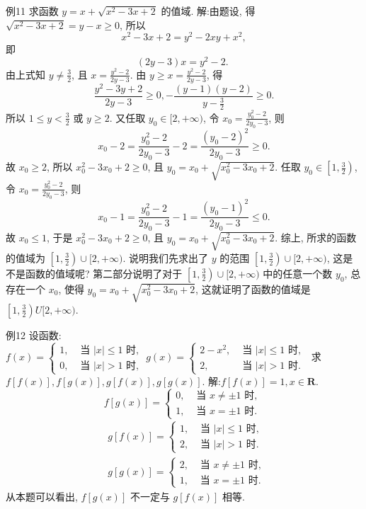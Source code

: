 例11 求函数 $y=x+\sqrt{x^2-3 x+2}$ 的值域.
解:由题设, 得 $\sqrt{x^2-3 x+2}=y-x \geqslant 0$, 所以
$$
x^2-3 x+2=y^2-2 x y+x^2,
$$
即
$$
(2 y-3) x=y^2-2 \text {. }
$$
由上式知 $y \neq \frac{3}{2}$, 且 $x=\frac{y^2-2}{2 y-3}$. 由 $y \geqslant x=\frac{y^2-2}{2 y-3}$, 得
$$
\frac{y^2-3 y+2}{2 y-3} \geqslant 0,-\frac{(y-1)(y-2)}{y-\frac{3}{2}} \geqslant 0 .
$$
所以 $1 \leqslant y<\frac{3}{2}$ 或 $y \geqslant 2$.
又任取 $y_0 \in[2,+\infty)$, 令 $x_0=\frac{y_0^2-2}{2 y_0-3}$, 则
$$
x_0-2=\frac{y_0^2-2}{2 y_0-3}-2=\frac{\left(y_0-2\right)^2}{2 y_0-3} \geqslant 0 .
$$
故 $x_0 \geqslant 2$, 所以 $x_0^2-3 x_0+2 \geqslant 0$, 且 $y_0=x_0+\sqrt{x_0^2-3 x_0+2}$.
任取 $y_0 \in\left[1, \frac{3}{2}\right)$, 令 $x_0=\frac{y_0^2-2}{2 y_0-3}$, 则
$$
x_0-1=\frac{y_0^2-2}{2 y_0-3}-1=\frac{\left(y_0-1\right)^2}{2 y_0-3} \leqslant 0 .
$$
故 $x_0 \leqslant 1$, 于是 $x_0^2-3 x_0+2 \geqslant 0$, 且 $y_0=x_0+\sqrt{x_0^2-3 x_0+2}$.
综上, 所求的函数的值域为 $\left[1, \frac{3}{2}\right) \cup[2,+\infty)$.
说明我们先求出了 $y$ 的范围 $\left[1, \frac{3}{2}\right) \cup[2,+\infty)$, 这是不是函数的值域呢? 第二部分说明了对于 $\left[1, \frac{3}{2}\right) \cup[2,+\infty)$ 中的任意一个数 $y_0$, 总存在一个 $x_0$, 使得 $y_0=x_0+\sqrt{x_0^2-3 x_0+2}$, 这就证明了函数的值域是 $\left[1, \frac{3}{2}\right) U [2,+\infty)$.



例12 设函数:
$f(x)=\left\{\begin{array}{ll}1, & \text { 当 }|x| \leqslant 1 \text { 时, } \\ 0, & \text { 当 }|x|>1 \text { 时, }\end{array} g(x)= \begin{cases}2-x^2, & \text { 当 }|x| \leqslant 1 \text { 时, } \\ 2, & \text { 当 }|x|>1 \text { 时.
}\end{cases}\right.$
求 $f[f(x)], f[g(x)], g[f(x)], g[g(x)]$.
解:$f[f(x)]=1, x \in \mathbf{R}$.
$$
f[g(x)]= \begin{cases}0, & \text { 当 } x \neq \pm 1 \text { 时, } \\ 1, & \text { 当 } x= \pm 1 \text { 时.
}\end{cases}
$$
$$
\begin{aligned}
& g[f(x)]= \begin{cases}1, & \text { 当 }|x| \leqslant 1 \text { 时, } \\
2, & \text { 当 }|x|>1 \text { 时.
}\end{cases} \\
& g[g(x)]= \begin{cases}2, & \text { 当 } x \neq \pm 1 \text { 时, } \\
1, & \text { 当 } x= \pm 1 \text { 时.
}\end{cases}
\end{aligned}
$$
从本题可以看出, $f[g(x)]$ 不一定与 $g[f(x)]$ 相等.



